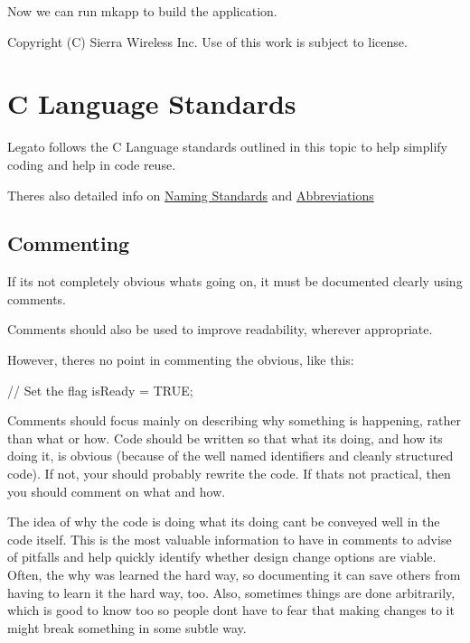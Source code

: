 Now we can run {\ttfamily mkapp} to build the application.








Copyright (C) Sierra Wireless Inc. Use of this work is subject to license. \hypertarget{ccodingStdsMain}{}\section{C Language Standards}\label{ccodingStdsMain}
Legato follows the C Language standards outlined in this topic to help simplify coding and help in code reuse.





There\textquotesingle{}s also detailed info on \hyperlink{ccodingStdsNaming}{Naming Standards} and \hyperlink{ccodingStdsAbbr}{Abbreviations}\hypertarget{ccoding_stds_main_cstdsparamCommenting}{}\subsection{Commenting}\label{ccoding_stds_main_cstdsparamCommenting}
If it\textquotesingle{}s not completely obvious what\textquotesingle{}s going on, it must be documented clearly using comments.

Comments should also be used to improve readability, wherever appropriate.

However, there\textquotesingle{}s no point in commenting the obvious, like this\+: \begin{DoxyVerb}// Set the flag
isReady = TRUE; \end{DoxyVerb}


Comments should focus mainly on describing why something is happening, rather than what or how. Code should be written so that what it\textquotesingle{}s doing, and how it\textquotesingle{}s doing it, is obvious (because of the well named identifiers and cleanly structured code). If not, your should probably rewrite the code. If that\textquotesingle{}s not practical, then you should comment on what and how.

The idea of why the code is doing what it\textquotesingle{}s doing can\textquotesingle{}t be conveyed well in the code itself. This is the most valuable information to have in comments to advise of pitfalls and help quickly identify whether design change options are viable. Often, the \textquotesingle{}\textquotesingle{}why\textquotesingle{}\textquotesingle{} was learned the hard way, so documenting it can save others from having to learn it the hard way, too. Also, sometimes things are done arbitrarily, which is good to know too so people don\textquotesingle{}t have to fear that making changes to it might break something in some subtle way.

